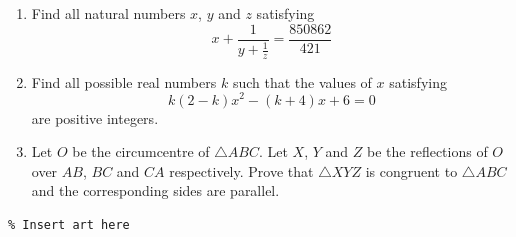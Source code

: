 \documentclass{article}
\begin{document}
\begin{enumerate}[1.]
\item %
Find all natural numbers $x$, $y$ and $z$ satisfying 
$$x + \frac{1}{y + \frac{1}{z}} = \frac{850862}{421}$$


\item %
Find all possible real numbers $k$ such that the values of $x$ satisfying
$$k(2 - k)x^2 - (k + 4)x + 6 = 0$$
are positive integers.


\item %
Let $O$ be the circumcentre of $\triangle ABC$. Let $X$, $Y$ and $Z$ be the reflections of $O$ over $AB$, $BC$ and $CA$ respectively. Prove that $\triangle XYZ$ is congruent to $\triangle ABC$ and the corresponding sides are parallel.



\end{enumerate}


\vfill
\begin{center} \begin{verbatim}
% Insert art here
\end{verbatim} \end{center}
\end{document}
